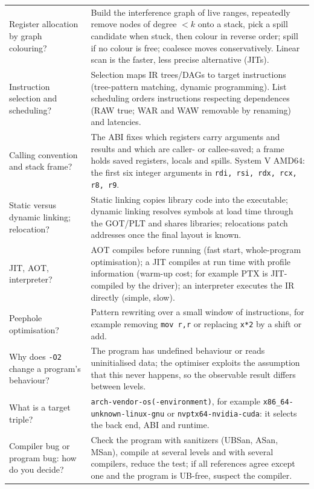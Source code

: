 \documentclass[10pt,a4paper,openany,oneside]{report}
\begin{document}
\begin{center}
\begin{xltabular}{\textwidth}{@{}L{4.6cm}Y@{}}
Register allocation by graph colouring? & Build the interference graph of live ranges, repeatedly remove nodes of degree $<k$ onto a stack, pick a spill candidate when stuck, then colour in reverse order; spill if no colour is free; coalesce moves conservatively. Linear scan is the faster, less precise alternative (JITs).\\
Instruction selection and scheduling? & Selection maps IR trees/DAGs to target instructions (tree-pattern matching, dynamic programming). List scheduling orders instructions respecting dependences (RAW true; WAR and WAW removable by renaming) and latencies.\\
Calling convention and stack frame? & The ABI fixes which registers carry arguments and results and which are caller- or callee-saved; a frame holds saved registers, locals and spills. System V AMD64: the first six integer arguments in \texttt{rdi, rsi, rdx, rcx, r8, r9}.\\
Static versus dynamic linking; relocation? & Static linking copies library code into the executable; dynamic linking resolves symbols at load time through the GOT/PLT and shares libraries; relocations patch addresses once the final layout is known.\\
JIT, AOT, interpreter? & AOT compiles before running (fast start, whole-program optimisation); a JIT compiles at run time with profile information (warm-up cost; for example PTX is JIT-compiled by the driver); an interpreter executes the IR directly (simple, slow).\\
Peephole optimisation? & Pattern rewriting over a small window of instructions, for example removing \texttt{mov r,r} or replacing \texttt{x*2} by a shift or add.\\
Why does \texttt{-O2} change a program's behaviour? & The program has undefined behaviour or reads uninitialised data; the optimiser exploits the assumption that this never happens, so the observable result differs between levels.\\
What is a target triple? & \texttt{arch-vendor-os(-environment)}, for example \texttt{x86\_64-unknown-linux-gnu} or \texttt{nvptx64-nvidia-cuda}: it selects the back end, ABI and runtime.\\
Compiler bug or program bug: how do you decide? & Check the program with sanitizers (UBSan, ASan, MSan), compile at several levels and with several compilers, reduce the test; if all references agree except one and the program is UB-free, suspect the compiler.\\
\bottomrule
\end{xltabular}
\end{center}
\end{document}
